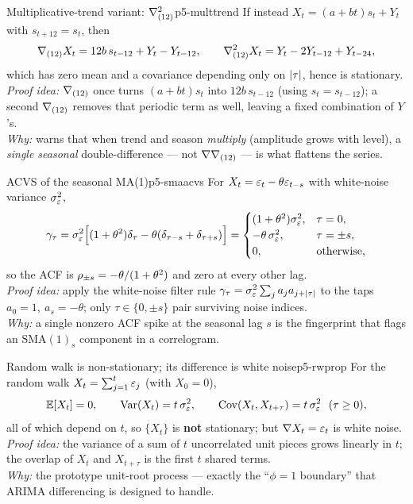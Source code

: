 \begin{proposition}{Multiplicative-trend variant: $\nabla_{(12)}^{2}$}{p5-multtrend}
If instead $X_t=(a+bt)s_t+Y_t$ with $s_{t+12}=s_t$, then
\[
\nabla_{(12)}X_t=12b\,s_{t-12}+Y_t-Y_{t-12},
\qquad
\nabla_{(12)}^{2}X_t=Y_t-2Y_{t-12}+Y_{t-24},
\]
which has zero mean and a covariance depending only on $\left\lvert \tau \right\rvert$, hence is
stationary.\\[2pt]
\textit{Proof idea:} $\nabla_{(12)}$ once turns $(a+bt)s_t$ into $12b\,s_{t-12}$
(using $s_t=s_{t-12}$); a second $\nabla_{(12)}$ removes that periodic term as
well, leaving a fixed combination of $Y$'s.\\
\textit{Why:} warns that when trend and season \emph{multiply} (amplitude grows
with level), a \emph{single seasonal} double-difference --- not
$\nabla\nabla_{(12)}$ --- is what flattens the series.
\end{proposition}

\begin{proposition}{ACVS of the seasonal MA(1)}{p5-smaacvs}
For $X_t=\varepsilon_t-\theta\varepsilon_{t-s}$ with white-noise variance $\sigma_\varepsilon^2$,
\[
\gamma_\tau=\sigma_\varepsilon^2\Bigl[(1+\theta^{2})\delta_\tau-\theta(\delta_{\tau-s}+\delta_{\tau+s})\Bigr]
=\begin{cases}
(1+\theta^{2})\sigma_\varepsilon^2, & \tau=0,\\
-\theta\,\sigma_\varepsilon^2, & \tau=\pm s,\\
0, &\text{otherwise,}
\end{cases}
\]
so the ACF is $\rho_{\pm s}=-\theta/(1+\theta^{2})$ and zero at every other lag.\\[2pt]
\textit{Proof idea:} apply the white-noise filter rule
$\gamma_\tau=\sigma_\varepsilon^2\sum_j a_j a_{j+\left\lvert \tau \right\rvert}$ to the taps
$a_0=1,\ a_s=-\theta$; only $\tau\in\{0,\pm s\}$ pair surviving noise indices.\\
\textit{Why:} a single nonzero ACF spike at the seasonal lag $s$ is the
fingerprint that flags an $\mathrm{SMA}(1)_s$ component in a correlogram.
\end{proposition}

\begin{proposition}{Random walk is non-stationary; its difference is white noise}{p5-rwprop}
For the random walk $X_t=\sum_{j=1}^{t}\varepsilon_j$ (with $X_0=0$),
\[
\mathbb{E}[X_t]=0,\qquad \operatorname{Var}(X_t)=t\,\sigma_\varepsilon^2,\qquad
\operatorname{Cov}(X_t,X_{t+\tau})=t\,\sigma_\varepsilon^2\ \ (\tau\ge0),
\]
all of which depend on $t$, so $\{X_t\}$ is \textbf{not} stationary; but
$\nabla X_t=\varepsilon_t$ is white noise.\\[2pt]
\textit{Proof idea:} the variance of a sum of $t$ uncorrelated unit pieces grows
linearly in $t$; the overlap of $X_t$ and $X_{t+\tau}$ is the first $t$ shared
terms.\\
\textit{Why:} the prototype unit-root process --- exactly the ``$\phi=1$
boundary'' that ARIMA differencing is designed to handle.
\end{proposition}

